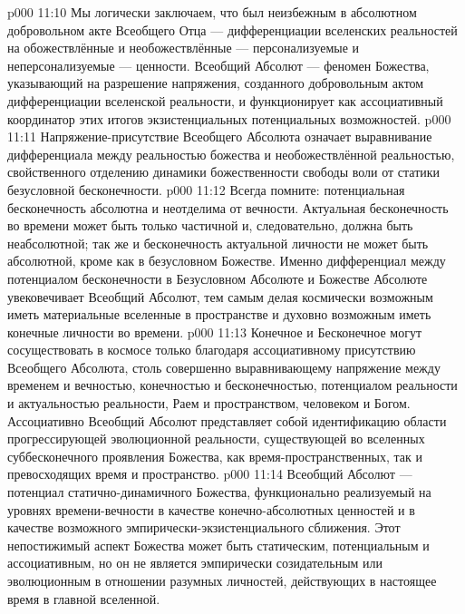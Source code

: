 \vs p000 11:10 \pc {}Мы логически заключаем, что  был неизбежным в абсолютном добровольном акте Всеобщего Отца --- дифференциации вселенских реальностей на обожествлённые и необожествлённые --- персонализуемые и неперсонализуемые --- ценности. Всеобщий Абсолют --- феномен Божества, указывающий на разрешение напряжения, созданного добровольным актом дифференциации вселенской реальности, и функционирует как ассоциативный координатор этих итогов экзистенциальных потенциальных возможностей.
\vs p000 11:11 \pc Напряжение\hyp{}присутствие Всеобщего Абсолюта означает выравнивание дифференциала между реальностью божества и необожествлённой реальностью, свойственного отделению динамики божественности свободы воли от статики безусловной бесконечности.
\vs p000 11:12 \pc Всегда помните: потенциальная бесконечность абсолютна и неотделима от вечности. Актуальная бесконечность во времени может быть только частичной и, следовательно, должна быть неабсолютной; так же и бесконечность актуальной личности не может быть абсолютной, кроме как в безусловном Божестве. Именно дифференциал между потенциалом бесконечности в Безусловном Абсолюте и Божестве Абсолюте увековечивает Всеобщий Абсолют, тем самым делая космически возможным иметь материальные вселенные в пространстве и духовно возможным иметь конечные личности во времени.
\vs p000 11:13 Конечное и Бесконечное могут сосуществовать в космосе только благодаря ассоциативному присутствию Всеобщего Абсолюта, столь совершенно выравнивающему напряжение между временем и вечностью, конечностью и бесконечностью, потенциалом реальности и актуальностью реальности, Раем и пространством, человеком и Богом. Ассоциативно Всеобщий Абсолют представляет собой идентификацию области прогрессирующей эволюционной реальности, существующей во вселенных суббесконечного проявления Божества, как время\hyp{}пространственных, так и превосходящих время и пространство.
\vs p000 11:14 Всеобщий Абсолют --- потенциал статично\hyp{}динамичного Божества, функционально реализуемый на уровнях времени\hyp{}вечности в качестве конечно\hyp{}абсолютных ценностей и в качестве возможного эмпирически\hyp{}экзистенциального сближения. Этот непостижимый аспект Божества может быть статическим, потенциальным и ассоциативным, но он не является эмпирически созидательным или эволюционным в отношении разумных личностей, действующих в настоящее время в главной вселенной.
